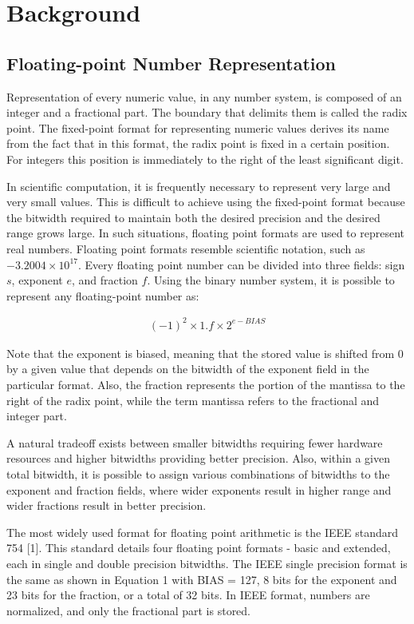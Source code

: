 \section{Background}
\label{sec:background}
\subsection{Floating-point Number Representation}
Representation of every numeric value, in any number system, is composed of an integer and a fractional part. The boundary that delimits them is called the radix point. The fixed-point format for representing numeric values derives its name from the fact that in this format, the radix point is fixed in a certain position. For integers this position is immediately to the right of the least significant digit.

In scientific computation, it is frequently necessary to represent very large and very small values. This is difficult to achieve using the fixed-point format because the bitwidth required to maintain both the desired precision and the desired range grows large. In such situations, floating point formats are used to represent real numbers. Floating point formats resemble scientific notation, such as $-3.2004\times10^{17}$. Every floating point number can be divided into three fields: sign $s$, exponent $e$, and fraction $f$. Using the binary number system, it is possible to represent any floating-point number as:

\begin{eqnarray} \label{eq:float}
(-1)^{2} \times 1.f \times 2^{e-BIAS}
\end{eqnarray}

Note that the exponent is biased, meaning that the stored value is shifted from 0 by a given value that depends on the bitwidth of the exponent field in the particular format. Also, the fraction represents the portion of the mantissa
to the right of the radix point, while the term mantissa refers to the fractional and integer part.

A natural tradeoff exists between smaller bitwidths requiring fewer hardware resources and higher bitwidths providing better precision. Also, within a given total bitwidth, it is possible to assign various combinations of bitwidths to the exponent and fraction fields, where wider exponents result in higher range and wider fractions result in better precision.

The most widely used format for floating point arithmetic is the IEEE standard 754 [1]. This standard details four floating point formats - basic and extended, each in single and double precision bitwidths. The IEEE single precision
format is the same as shown in Equation 1 with BIAS = 127, 8 bits for the exponent and 23 bits for the fraction, or a total of 32 bits. In IEEE format, numbers are normalized, and only the fractional part is stored.


